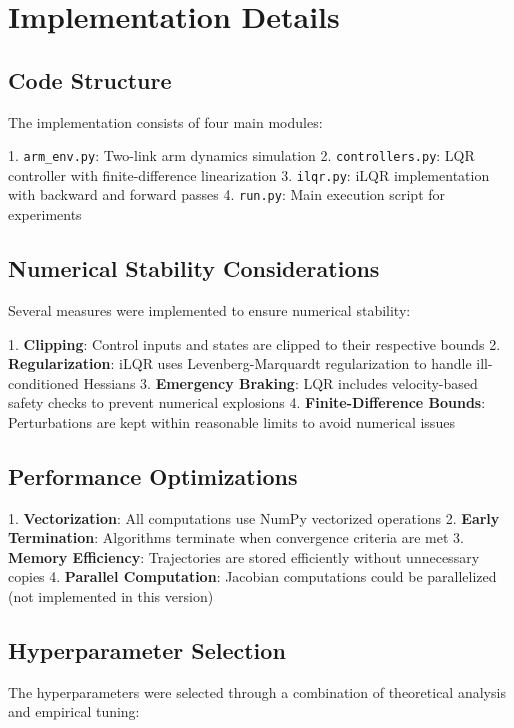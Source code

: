 \documentclass[conference]{IEEEtran}
\begin{document}
\section{Implementation Details}

\subsection{Code Structure}

The implementation consists of four main modules:

1. \texttt{arm\_env.py}: Two-link arm dynamics simulation
2. \texttt{controllers.py}: LQR controller with finite-difference linearization
3. \texttt{ilqr.py}: iLQR implementation with backward and forward passes
4. \texttt{run.py}: Main execution script for experiments

\subsection{Numerical Stability Considerations}

Several measures were implemented to ensure numerical stability:

1. \textbf{Clipping}: Control inputs and states are clipped to their respective bounds
2. \textbf{Regularization}: iLQR uses Levenberg-Marquardt regularization to handle ill-conditioned Hessians
3. \textbf{Emergency Braking}: LQR includes velocity-based safety checks to prevent numerical explosions
4. \textbf{Finite-Difference Bounds}: Perturbations are kept within reasonable limits to avoid numerical issues

\subsection{Performance Optimizations}

1. \textbf{Vectorization}: All computations use NumPy vectorized operations
2. \textbf{Early Termination}: Algorithms terminate when convergence criteria are met
3. \textbf{Memory Efficiency}: Trajectories are stored efficiently without unnecessary copies
4. \textbf{Parallel Computation}: Jacobian computations could be parallelized (not implemented in this version)

\subsection{Hyperparameter Selection}

The hyperparameters were selected through a combination of theoretical analysis and empirical tuning:
\end{document}
